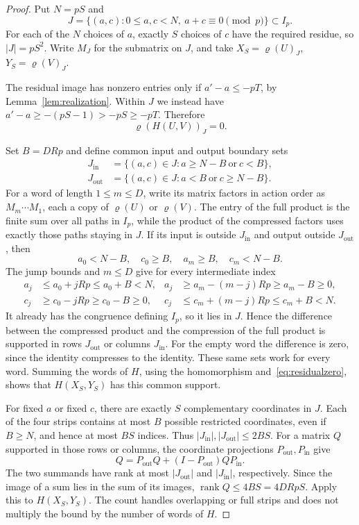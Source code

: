 \documentclass{article}
\newcommand{\rank}{\operatorname{rank}}
\begin{document}
\begin{proof}
Put $N=pS$ and
\[
 J=\{(a,c):0\leq a,c<N,\ a+c\equiv0\pmod p\}\subset I_p.
\]
For each of the $N$ choices of $a$, exactly $S$ choices of $c$ have the required residue, so $|J|=pS^2$. Write $M_J$ for the submatrix on $J$, and take $X_S=\varrho(U)_J$, $Y_S=\varrho(V)_J$.

The residual image has nonzero entries only if $a'-a\leq-pT$, by Lemma~\ref{lem:realization}. Within $J$ we instead have
$a'-a\geq-(pS-1)>-pS\geq-pT$. Therefore
\[
 \varrho(H(U,V))_J=0.\tag{6.11}\label{eq:residualzero}
\]

Set $B=DRp$ and define common input and output boundary sets
\begin{align*}
 J_{\mathrm{in}}&=\{(a,c)\in J:a\geq N-B\ \text{or}\ c<B\},\\
 J_{\mathrm{out}}&=\{(a,c)\in J:a<B\ \text{or}\ c\geq N-B\}.
\end{align*}
For a word of length $1\leq m\leq D$, write its matrix factors in action order as $M_m\cdots M_1$, each a copy of $\varrho(U)$ or $\varrho(V)$. The entry of the full product is the finite sum over all paths in $I_p$, while the product of the compressed factors uses exactly those paths staying in $J$. If its input is outside $J_{\mathrm{in}}$ and output outside $J_{\mathrm{out}}$, then
\[
 a_0<N-B,\quad c_0\geq B,\quad a_m\geq B,\quad c_m<N-B.
\]
The jump bounds and $m\leq D$ give for every intermediate index
\begin{align*}
 a_j&\leq a_0+jRp\leq a_0+B<N,&
 a_j&\geq a_m-(m-j)Rp\geq a_m-B\geq0,\\
 c_j&\geq c_0-jRp\geq c_0-B\geq0,&
 c_j&\leq c_m+(m-j)Rp\leq c_m+B<N.
\end{align*}
It already has the congruence defining $I_p$, so it lies in $J$. Hence the difference between the compressed product and the compression of the full product is supported in rows $J_{\mathrm{out}}$ or columns $J_{\mathrm{in}}$. For the empty word the difference is zero, since the identity compresses to the identity. These same sets work for every word. Summing the words of $H$, using the homomorphism and~\eqref{eq:residualzero}, shows that $H(X_S,Y_S)$ has this common support.

For fixed $a$ or fixed $c$, there are exactly $S$ complementary coordinates in $J$. Each of the four strips contains at most $B$ possible restricted coordinates, even if $B\geq N$, and hence at most $BS$ indices. Thus
$|J_{\mathrm{in}}|,|J_{\mathrm{out}}|\leq2BS$.
For a matrix $Q$ supported in those rows or columns, the coordinate projections $P_{\mathrm{out}},P_{\mathrm{in}}$ give
\[
 Q=P_{\mathrm{out}}Q+(I-P_{\mathrm{out}})QP_{\mathrm{in}}.
\]
The two summands have rank at most $|J_{\mathrm{out}}|$ and $|J_{\mathrm{in}}|$, respectively. Since the image of a sum lies in the sum of its images, $\rank Q\leq4BS=4DRpS$. Apply this to $H(X_S,Y_S)$. The count handles overlapping or full strips and does not multiply the bound by the number of words of $H$.
\end{proof}
\end{document}
